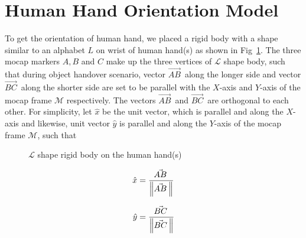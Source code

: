 \documentclass[a4paper, 12pt, oneside]{Thesis}  %
\begin{document}
\clearpage

\section{Human Hand Orientation Model}\label{hand_orientation}
To get the orientation of human hand, we placed a rigid body with a shape similar to an alphabet $L$ on wrist of human hand(s) as shown in Fig~\ref{fig:lshapes}. The three mocap markers $A, B$ and $C$ make up the three vertices of $\mathcal{L}$ shape body, such that during object handover scenario, vector $\vec{AB}^{\,}$ along the longer side and vector $\vec{BC}^{\,}$ along the shorter side are set to be parallel with the $X$-axis and $Y$-axis of the mocap frame $\mathcal{M}$ respectively. The vectors $\vec{AB}^{\,}$ and $\vec{BC}^{\,}$ are orthogonal to each other. For simplicity, let $\hat{x}$ be the unit vector, which is parallel and along the $X$-axis and likewise, unit vector $\hat{y}$ is parallel and along the $Y$-axis of the mocap frame $\mathcal{M}$, such that

\begin{figure}[ht]
	\caption{$\mathcal{L}$ shape rigid body on the human hand(s)}
	\label{fig:lshapes}
\end{figure}

\begin{equation*}
\hat{x} = \frac{\vec{AB}^{\,}}{\norm{\vec{AB}^{\,}}}
\end{equation*}

\begin{equation*}
\hat{y} = \frac{\vec{BC}^{\,}}{\norm{\vec{BC}^{\,}}}
\end{equation*}
\end{document}
